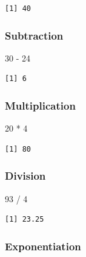 \documentclass[
  letterpaper,
  DIV=11,
  numbers=noendperiod]{scrreprt}
\newenvironment{Shaded}{\begin{snugshade}}{\end{snugshade}}
\newcommand{\DecValTok}[1]{\textcolor[rgb]{0.68,0.00,0.00}{#1}}
\newcommand{\SpecialCharTok}[1]{\textcolor[rgb]{0.37,0.37,0.37}{#1}}
\begin{document}
\begin{verbatim}
[1] 40
\end{verbatim}

\subsubsection{Subtraction}\label{subtraction}

\begin{Shaded}
\begin{Highlighting}[]
\DecValTok{30} \SpecialCharTok{{-}} \DecValTok{24}
\end{Highlighting}
\end{Shaded}

\begin{verbatim}
[1] 6
\end{verbatim}

\subsubsection{Multiplication}\label{multiplication}

\begin{Shaded}
\begin{Highlighting}[]
\DecValTok{20} \SpecialCharTok{*} \DecValTok{4}
\end{Highlighting}
\end{Shaded}

\begin{verbatim}
[1] 80
\end{verbatim}

\subsubsection{Division}\label{division}

\begin{Shaded}
\begin{Highlighting}[]
\DecValTok{93} \SpecialCharTok{/} \DecValTok{4}
\end{Highlighting}
\end{Shaded}

\begin{verbatim}
[1] 23.25
\end{verbatim}

\subsubsection{Exponentiation}\label{exponentiation}
\end{document}
